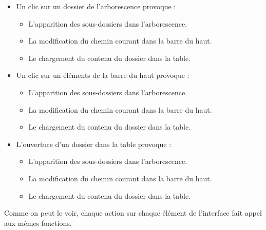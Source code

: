 \begin{itemize}
     \item Un clic sur un dossier de l'arborescence provoque :

     \begin{itemize}
          \item L'apparition des sous-dossiers dans l'arborescence.
          \item La modification du chemin courant dans la barre du haut.
          \item Le chargement du contenu du dossier dans la table.
     \end{itemize}

     \item Un clic sur un éléments de la barre du haut provoque :

     \begin{itemize}
          \item L'apparition des sous-dossiers dans l'arborescence.
          \item La modification du chemin courant dans la barre du haut.
          \item Le chargement du contenu du dossier dans la table.
     \end{itemize}

     \item L'ouverture d'un dossier dans la table provoque :

     \begin{itemize}
          \item L'apparition des sous-dossiers dans l'arborescence.
          \item La modification du chemin courant dans la barre du haut.
          \item Le chargement du contenu du dossier dans la table.
     \end{itemize}
\end{itemize}

Comme on peut le voir, chaque action sur chaque élément de l'interface fait appel aux mêmes fonctions.


